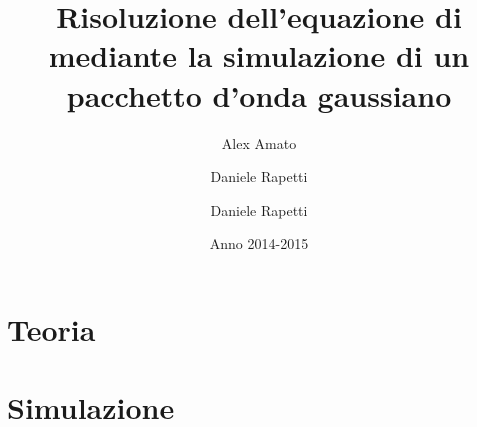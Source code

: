 \documentclass[10pt,a4paper]{article}
\author{Alex Amato \and Daniele Rapetti}
\date{Anno 2014-2015}
\title{Risoluzione dell'equazione di \Schrodinger mediante la simulazione di un pacchetto d'onda gaussiano}
\author{Daniele Rapetti}
\date{}
\numberwithin{equation}{subsection}
\begin{document}
\maketitle
\tableofcontents
\newpage
\part{Teoria}





\newpage
\part{Simulazione}


\end{document}
